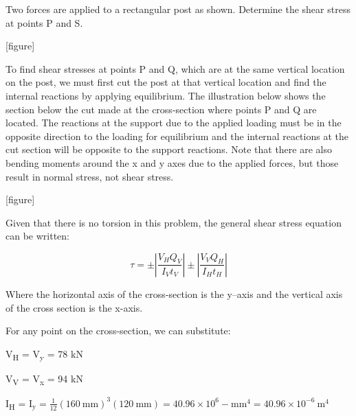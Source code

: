 \documentclass[
  letterpaper,
  DIV=11,
  numbers=noendperiod]{scrreprt}
\begin{document}
\begin{tcolorbox}[enhanced jigsaw, breakable, opacityback=0, toptitle=1mm, left=2mm, colback=white, opacitybacktitle=0.6, colframe=quarto-callout-note-color-frame, titlerule=0mm, arc=.35mm, leftrule=.75mm, bottomtitle=1mm, colbacktitle=quarto-callout-note-color!10!white, rightrule=.15mm, title={Example 14.5:}, bottomrule=.15mm, toprule=.15mm, coltitle=black]

Two forces are applied to a rectangular post as shown. Determine the
shear stress at points P and S.

{[}figure{]}

\begin{tcolorbox}[enhanced jigsaw, breakable, opacityback=0, toptitle=1mm, left=2mm, colback=white, opacitybacktitle=0.6, colframe=quarto-callout-note-color-frame, titlerule=0mm, arc=.35mm, leftrule=.75mm, bottomtitle=1mm, colbacktitle=quarto-callout-note-color!10!white, rightrule=.15mm, title={Solution}, bottomrule=.15mm, toprule=.15mm, coltitle=black]

To find shear stresses at points P and Q, which are at the same vertical
location on the post, we must first cut the post at that vertical
location and find the internal reactions by applying equilibrium. The
illustration below shows the section below the cut made at the
cross-section where points P and Q are located. The reactions at the
support due to the applied loading must be in the opposite direction to
the loading for equilibrium and the internal reactions at the cut
section will be opposite to the support reactions. Note that there are
also bending moments around the x and y axes due to the applied forces,
but those result in normal stress, not shear stress.

{[}figure{]}

Given that there is no torsion in this problem, the general shear stress
equation can be written:

\[
\tau= \pm\left|\frac{V_H Q_V}{I_V t_V}\right| \pm\left|\frac{V_V Q_H}{I_H t_H}\right|
\]

Where the horizontal axis of the cross-section is the y--axis and the
vertical axis of the cross section is the x-axis.

For any point on the cross-section, we can substitute:

V\textsubscript{H} = V\textsubscript{y} = 78 kN

V\textsubscript{V} = V\textsubscript{x} = 94 kN

I\textsubscript{H} =
\(\mathrm{I}_{\mathrm{y}}=\frac{1}{12}(160 \mathrm{~mm})^3(120 \mathrm{~mm})=40.96 \times 10^6-\mathrm{mm}^4=40.96 \times 10^{-6} \mathrm{~m}^4\)


\end{tcolorbox}
\end{tcolorbox}
\end{document}
